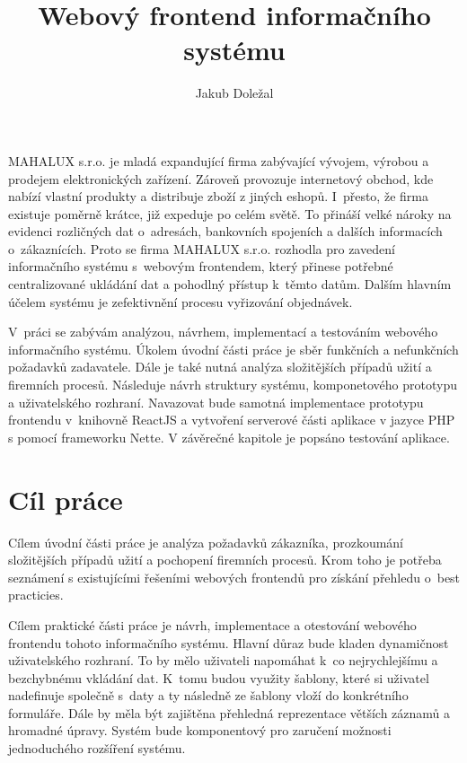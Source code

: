 \documentclass[thesis=B,czech]{FITthesis}[2012/06/26]
\title{Webový frontend informačního systému}
\author{Jakub Doležal} %
\begin{document}

\begin{introduction}
	MAHALUX s.r.o. je mladá expandující firma zabývající vývojem, výrobou a prodejem elektronických zařízení. Zároveň provozuje internetový obchod, kde nabízí vlastní produkty a distribuje zboží z jiných eshopů. I~přesto, že firma existuje poměrně krátce, již expeduje po celém světě. To přináší velké nároky na evidenci rozličných dat o~adresách, bankovních spojeních a dalších informacích o~zákaznících. Proto se firma MAHALUX s.r.o. rozhodla pro zavedení informačního systému s~webovým frontendem, který přinese potřebné centralizované ukládání dat a pohodlný přístup k~těmto datům. Dalším hlavním účelem systému je zefektivnění procesu vyřizování objednávek.
	
	V~práci se zabývám analýzou, návrhem, implementací a testováním webového informačního systému.
	Úkolem úvodní části práce je sběr funkčních a nefunkčních požadavků zadavatele. Dále je také nutná analýza složitějších případů užití a firemních procesů. Následuje návrh struktury systému, komponetového prototypu a uživatelského rozhraní. Navazovat bude samotná implementace prototypu frontendu v~knihovně ReactJS a vytvoření serverové části aplikace v jazyce PHP s pomocí frameworku Nette. V závěrečné kapitole je popsáno testování aplikace.
\end{introduction}

\chapter{Cíl práce}
	Cílem úvodní části práce je analýza požadavků zákazníka, prozkoumání složitějších případů užití a pochopení firemních procesů. Krom toho je potřeba seznámení s existujícími řešeními webových frontendů pro získání přehledu o~best practicies.
	
	Cílem praktické části práce je návrh, implementace a otestování webového frontendu tohoto informačního systému. Hlavní důraz bude kladen dynamičnost uživatelského rozhraní. To by mělo uživateli napomáhat k~co nejrychlejšímu a bezchybnému vkládání dat. K~tomu budou využity šablony, které si uživatel nadefinuje společně s~daty a ty následně ze šablony vloží do konkrétního formuláře. Dále by měla být zajištěna přehledná reprezentace větších záznamů a hromadné úpravy. Systém bude komponentový pro zaručení možnosti jednoduchého rozšíření systému.
	
\end{document}
